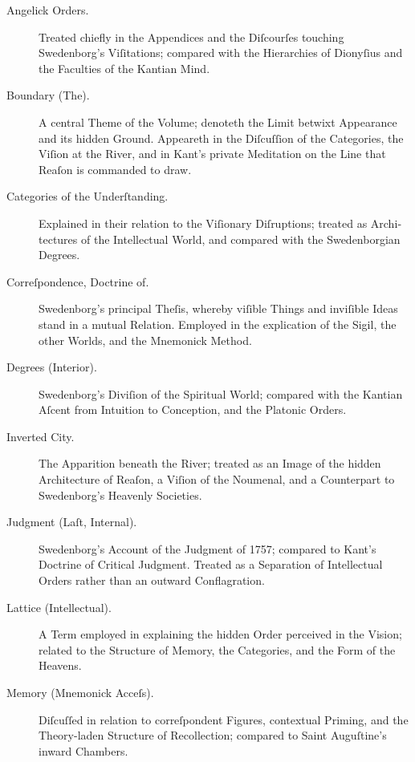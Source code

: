 \documentclass[12pt]{article}
\begin{document}
\vspace{1em}

\begin{description}

\item[Angelick Orders.]  
Treated chiefly in the Appendices and the Diſcourſes touching Swedenborg’s 
Viſitations; compared with the Hierarchies of Dionyſius and the Faculties 
of the Kantian Mind.

\item[Boundary (The).]  
A central Theme of the Volume; denoteth the Limit betwixt Appearance and 
its hidden Ground. Appeareth in the Diſcuſſion of the Categories, the 
Viſion at the River, and in Kant’s private Meditation on the Line that 
Reaſon is commanded to draw.

\item[Categories of the Underſtanding.]  
Explained in their relation to the Viſionary Diſruptions; treated as 
Archi­tectures of the Intellectual World, and compared with the 
Swedenborgian Degrees.

\item[Correſpondence, Doctrine of.]  
Swedenborg’s principal Theſis, whereby viſible Things and inviſible 
Ideas stand in a mutual Relation. Employed in the explication of 
the Sigil, the other Worlds, and the Mnemonick Method.

\item[Degrees (Interior).]  
Swedenborg’s Diviſion of the Spiritual World; compared with the 
Kantian Aſcent from Intuition to Conception, and the Platonic Orders.

\item[Inverted City.]  
The Apparition beneath the River; treated as an Image of the hidden 
Archi­tecture of Reaſon, a Viſion of the Noumenal, and a Counterpart to 
Swedenborg’s Heavenly Societies.

\item[Judgment (Laſt, Internal).]  
Swedenborg’s Account of the Judgment of 1757; compared to Kant’s 
Doctrine of Critical Judgment. Treated as a Separation of Intellectual 
Orders rather than an outward Conflagration.

\item[Lattice (Intellectual).]  
A Term employed in explaining the hidden Order perceived in the Vision; 
related to the Structure of Memory, the Categories, and the Form of the 
Heavens.

\item[Memory (Mnemonick Acceſs).]  
Diſcuſſed in relation to correſpondent Figures, contextual Priming, 
and the Theory-laden Structure of Recollection; compared to Saint 
Auguſtine’s inward Chambers.


\end{description}
\end{document}
